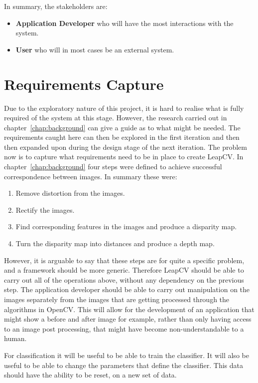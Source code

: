 \documentclass[11pt,oneside]{report}
\begin{document}
			In summary, the stakeholders are:
			\begin{itemize}
			\item \textbf{Application Developer} who will have the most interactions with the system.
			\item \textbf{User} who will in most cases be an external system.
			\end{itemize}
		
		\section{Requirements Capture}
			Due to the exploratory nature of this project, it is hard to realise what is fully required of the system at this stage.
			However, the research carried out in chapter~\ref{chap:background} can give a guide as to what might be needed.
			The requirements caught here can then be explored in the first iteration and then then expanded upon during the design stage of the next iteration.
			The problem now is to capture what requirements need to be in place to create LeapCV.
			In chapter~\ref{chap:background} four steps were defined to achieve successful correspondence between images.
			In summary these were:
			\begin{enumerate}
				\item Remove distortion from the images.
				\item Rectify the images.
				\item Find corresponding features in the images and produce a disparity map.
				\item Turn the disparity map into distances and produce a depth map.
			\end{enumerate}
			However, it is arguable to say that these steps are for quite a specific problem, and a framework should be more generic.
			Therefore LeapCV should be able to carry out all of the operations above, without any dependency on the previous step.
			The application developer should be able to carry out manipulation on the images separately from the images that are getting processed through the algorithms in OpenCV.
			This will allow for the development of an application that might show a before and after image for example, rather than only having access to an image post processing, that might have become non-understandable to a human.
			
			For classification it will be useful to be able to train the classifier.
			It will also be useful to be able to change the parameters that define the classifier.
			This data should have the ability to be reset, on a new set of data.
			
\end{document}
